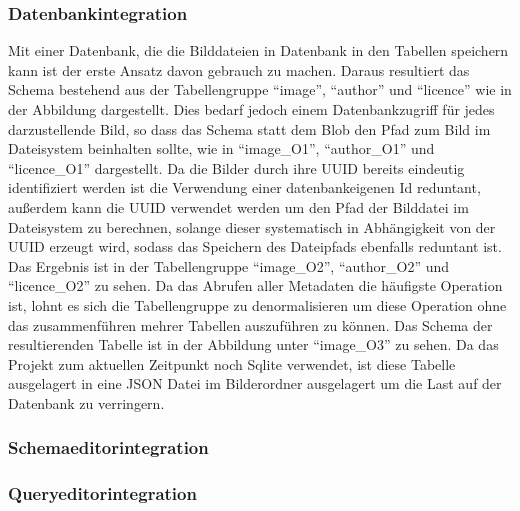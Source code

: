 \subsubsection{Datenbankintegration}


Mit einer Datenbank, die die Bilddateien in Datenbank in den Tabellen speichern
kann ist der erste Ansatz davon gebrauch zu machen. Daraus resultiert das Schema
bestehend aus der Tabellengruppe ``image'', ``author'' und ``licence'' wie in
der Abbildung dargestellt. Dies bedarf jedoch einem Datenbankzugriff für jedes
darzustellende Bild, so dass das Schema statt dem Blob den Pfad zum Bild im
Dateisystem beinhalten sollte, wie in ``image\_O1'', ``author\_O1'' und
``licence\_O1'' dargestellt. Da die Bilder durch ihre UUID bereits eindeutig
identifiziert werden ist die Verwendung einer datenbankeigenen Id reduntant,
außerdem kann die UUID verwendet werden um den Pfad der Bilddatei im Dateisystem
zu berechnen, solange dieser systematisch in Abhängigkeit von der UUID erzeugt
wird, sodass das Speichern des Dateipfads ebenfalls reduntant ist. Das Ergebnis
ist in der Tabellengruppe ``image\_O2'', ``author\_O2'' und ``licence\_O2'' zu
sehen. Da das Abrufen aller Metadaten die häufigste Operation ist, lohnt es sich
die Tabellengruppe zu denormalisieren um diese Operation ohne das zusammenführen
mehrer Tabellen auszuführen zu können. Das Schema der resultierenden Tabelle ist
in der Abbildung unter ``image\_O3'' zu sehen. Da das Projekt zum aktuellen
Zeitpunkt noch Sqlite verwendet, ist diese Tabelle ausgelagert in eine JSON
Datei im Bilderordner ausgelagert um die Last auf der Datenbank zu verringern.

\subsubsection{Schemaeditorintegration}



\subsubsection{Queryeditorintegration}



